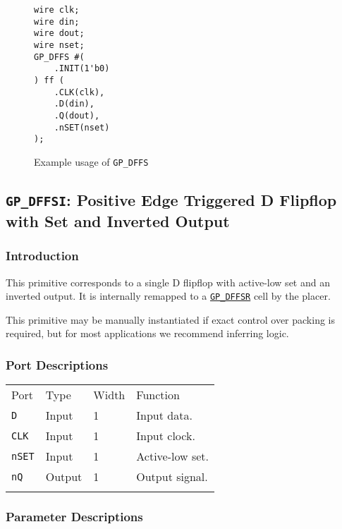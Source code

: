 \documentclass[11pt]{article}
\newcommand{\tokenstyle}[1]{\texttt{#1}}
\newcommand{\whenstyle}[1]{{\fontseries{sb}\selectfont#1}}
\newcommand{\tokenref}[2]{\hyperref[#2]{\tokenstyle{#1}}}
\newcommand{\thinhline}{\Xhline{1\arrayrulewidth}}
\newcommand{\thickhline}{\Xhline{2.5\arrayrulewidth}}
\begin{document}
\begin{figure}[h]
\begin{lstlisting}
wire clk;
wire din;
wire dout;
wire nset;
GP_DFFS #(
	.INIT(1'b0)
) ff (
	.CLK(clk),
	.D(din),
	.Q(dout),
	.nSET(nset)
);
\end{lstlisting}
\caption{Example usage of \tokenstyle{GP\_DFFS}}
\label{gp-dffs-example}
\end{figure}


\pagebreak
\subsection{\tokenstyle{GP\_DFFSI}: Positive Edge Triggered D Flipflop with Set and Inverted Output}
\label{gp-dffs}

\subsubsection{Introduction}
This primitive corresponds to a single D flipflop with active-low set and an inverted output. It is internally remapped
to a \tokenref{GP\_DFFSR}{gp-dffsr} cell by the placer.

This primitive may be manually instantiated if exact control over packing is required, but for most applications we
recommend inferring logic.

\subsubsection{Port Descriptions}

\begin{tabularx}{\textwidth}{lllX}
\thinhline
\whenstyle{Port} & \whenstyle{Type} & \whenstyle{Width} & \whenstyle{Function} \\
\thickhline
\tokenstyle{D} & Input & 1 & Input data. \\
\thinhline
\tokenstyle{CLK} & Input & 1 & Input clock. \\
\thinhline
\tokenstyle{nSET} & Input & 1 & Active-low set. \\
\thinhline
\tokenstyle{nQ} & Output & 1 & Output signal. \\
\thinhline
\end{tabularx}

\subsubsection{Parameter Descriptions}
\end{document}
